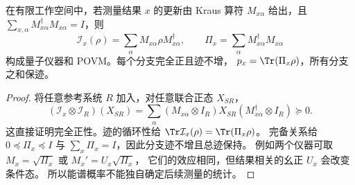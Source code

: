\begin{proposition}
在有限工作空间中，若测量结果 $x$ 的更新由 Kraus 算符
$M_{x\alpha}$ 给出，且 $\sum_{x,\alpha}M_{x\alpha}^\dagger M_{x\alpha}=I$，则
\[
\mathcal I_x(\rho)=\sum_\alpha M_{x\alpha}\rho M_{x\alpha}^\dagger,
\qquad \Pi_x=\sum_\alpha M_{x\alpha}^\dagger M_{x\alpha}
\]
构成量子仪器和 POVM。每个分支完全正且迹不增，
$p_x=\Tr(\Pi_x\rho)$，所有分支之和保迹。
\end{proposition}
\begin{proof}
将任意参考系统 $R$ 加入，对任意联合正态 $X_{SR}$，
\[
(\mathcal I_x\otimes\mathcal I_R)(X_{SR})
=\sum_\alpha(M_{x\alpha}\otimes I_R)X_{SR}
(M_{x\alpha}^\dagger\otimes I_R)\succeq0.
\]
这直接证明完全正性。迹的循环性给
$\Tr\mathcal I_x(\rho)=\Tr(\Pi_x\rho)$。
完备关系给 $0\preceq\Pi_x\preceq I$ 与 $\sum_x\Pi_x=I$，因此分支迹不增且总迹保持。
例如两个仪器可取 $M_x=\sqrt{\Pi_x}$ 或 $M_x'=U_x\sqrt{\Pi_x}$，
它们的效应相同，但结果相关的幺正 $U_x$ 会改变条件态。
所以能谱概率不能独自确定后续测量的统计。
\end{proof}

